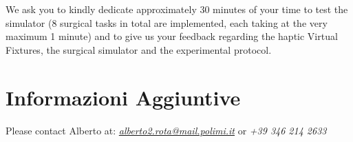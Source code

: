 \documentclass{article}
\begin{document}
\noindent We ask you to kindly dedicate approximately 30 minutes of your time to test the simulator (8 surgical tasks in total are implemented, each taking at the very maximum 1 minute) and to give us your feedback regarding the haptic Virtual Fixtures, the surgical simulator and the experimental protocol.

\section{Informazioni Aggiuntive}
Please contact Alberto at: \textit{\href{mailto:alberto2.rota@mail.polimi.it}{alberto2.rota@mail.polimi.it}} or \textit{+39 346 214 2633}


\end{document}
